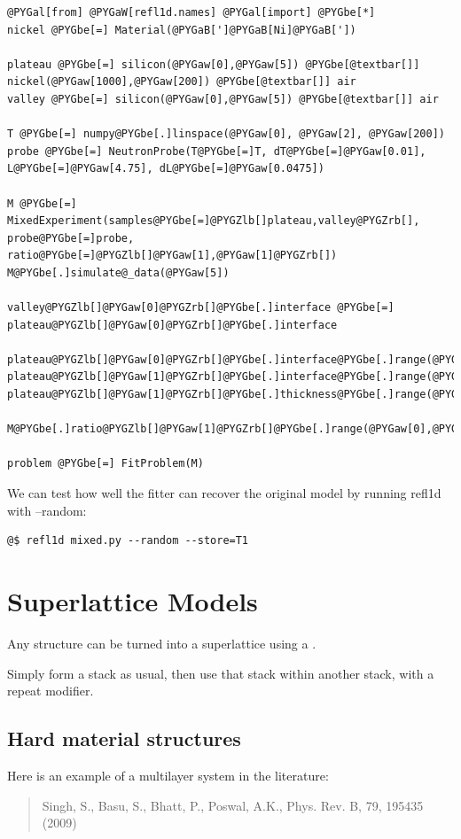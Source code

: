 \documentclass[letterpaper,10pt,english]{sphinxmanual}
\begin{document}
\begin{Verbatim}[commandchars=@\[\]]
@PYGal[from] @PYGaW[refl1d.names] @PYGal[import] @PYGbe[*]
nickel @PYGbe[=] Material(@PYGaB[']@PYGaB[Ni]@PYGaB['])

plateau @PYGbe[=] silicon(@PYGaw[0],@PYGaw[5]) @PYGbe[@textbar[]] nickel(@PYGaw[1000],@PYGaw[200]) @PYGbe[@textbar[]] air
valley @PYGbe[=] silicon(@PYGaw[0],@PYGaw[5]) @PYGbe[@textbar[]] air

T @PYGbe[=] numpy@PYGbe[.]linspace(@PYGaw[0], @PYGaw[2], @PYGaw[200])
probe @PYGbe[=] NeutronProbe(T@PYGbe[=]T, dT@PYGbe[=]@PYGaw[0.01], L@PYGbe[=]@PYGaw[4.75], dL@PYGbe[=]@PYGaw[0.0475])

M @PYGbe[=] MixedExperiment(samples@PYGbe[=]@PYGZlb[]plateau,valley@PYGZrb[], probe@PYGbe[=]probe, ratio@PYGbe[=]@PYGZlb[]@PYGaw[1],@PYGaw[1]@PYGZrb[])
M@PYGbe[.]simulate@_data(@PYGaw[5])

valley@PYGZlb[]@PYGaw[0]@PYGZrb[]@PYGbe[.]interface @PYGbe[=] plateau@PYGZlb[]@PYGaw[0]@PYGZrb[]@PYGbe[.]interface

plateau@PYGZlb[]@PYGaw[0]@PYGZrb[]@PYGbe[.]interface@PYGbe[.]range(@PYGaw[0],@PYGaw[200])
plateau@PYGZlb[]@PYGaw[1]@PYGZrb[]@PYGbe[.]interface@PYGbe[.]range(@PYGaw[0],@PYGaw[200])
plateau@PYGZlb[]@PYGaw[1]@PYGZrb[]@PYGbe[.]thickness@PYGbe[.]range(@PYGaw[200],@PYGaw[1800])

M@PYGbe[.]ratio@PYGZlb[]@PYGaw[1]@PYGZrb[]@PYGbe[.]range(@PYGaw[0],@PYGaw[5])

problem @PYGbe[=] FitProblem(M)
\end{Verbatim}

We can test how well the fitter can recover the original model
by running refl1d with --random:

\begin{Verbatim}[commandchars=@\[\]]
@$ refl1d mixed.py --random --store=T1
\end{Verbatim}


\section{Superlattice Models}
\label{examples/superlattice/readme::doc}\label{examples/superlattice/readme:superlattice-models}
Any structure can be turned into a superlattice using a {\hyperref[api/model:refl1d.model.Repeat]{}}.

Simply form a stack as usual, then use that stack within another stack, with a
repeat modifier.


\subsection{Hard material structures}
\label{examples/superlattice/NiTi:hard-material-structures}\label{examples/superlattice/NiTi::doc}
Here is an example of a multilayer system in the literature:
\begin{quote}

Singh, S., Basu, S., Bhatt, P., Poswal, A.K.,
Phys. Rev. B, 79, 195435 (2009)
\end{quote}
\end{document}
